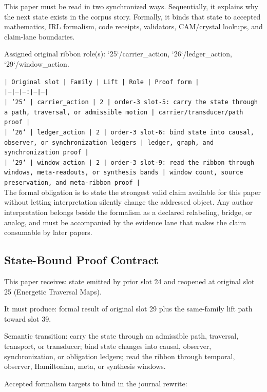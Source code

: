 \documentclass[11pt]{article}
\begin{document}
This paper must be read in two synchronized ways. Sequentially, it explains why
the next state exists in the corpus story. Formally, it binds that state to
accepted mathematics, IRL formalism, code receipts, validators, CAM/crystal
lookups, and claim-lane boundaries.

Assigned original ribbon role(s): `25`/carrier\_action, `26`/ledger\_action, `29`/window\_action.

\noindent\texttt{| Original slot | Family | Lift | Role | Proof form |}\\
\noindent\texttt{|---|---|---:|---|---|}\\
\noindent\texttt{| `25` | carrier\_action | 2 | order-3 slot-5: carry the state through a path, traversal, or admissible motion | carrier/transducer/path proof |}\\
\noindent\texttt{| `26` | ledger\_action | 2 | order-3 slot-6: bind state into causal, observer, or synchronization ledgers | ledger, graph, and synchronization proof |}\\
\noindent\texttt{| `29` | window\_action | 2 | order-3 slot-9: read the ribbon through windows, meta-readouts, or synthesis bands | window count, source preservation, and meta-ribbon proof |}\\

The formal obligation is to state the strongest valid claim available for this
paper without letting interpretation silently change the addressed object. Any
author interpretation belongs beside the formalism as a declared relabeling,
bridge, or analog, and must be accompanied by the evidence lane that makes the
claim consumable by later papers.

\subsection*{State-Bound Proof Contract}

This paper receives: state emitted by prior slot 24 and reopened at original slot 25 (Energetic Traversal Maps).

It must produce: formal result of original slot 29 plus the same-family lift path toward slot 39.

Semantic transition: carry the state through an admissible path, traversal, transport, or transducer; bind state changes into causal, observer, synchronization, or obligation ledgers; read the ribbon through temporal, observer, Hamiltonian, meta, or synthesis windows.

Accepted formalism targets to bind in the journal rewrite:
\end{document}
